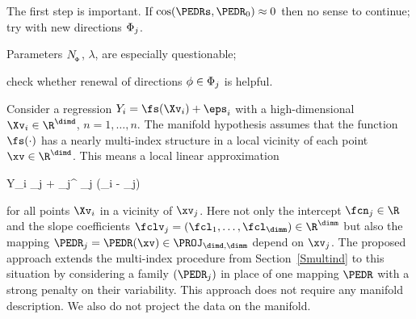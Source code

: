 {\color{blue} 
\begin{mylist}
\item
The first step is important. 
If \( \cos(\PEDRs,\PEDR_{0}) \approx 0 \) then no sense to continue;
try with new directions \( \Phi_{j} \).

\item
Parameters \( N_{_{\! \Phi}} \), \( \lambda \), are especially questionable;

\item
check whether renewal of directions \( \phi \in \Phi_{j} \) is helpful.


\end{mylist}

}


Consider a regression \( Y_{i} = \fs(\Xv_{i}) + \eps_{i} \) with a high-dimensional \( \Xv_{i} \in \R^{\dimd} \),
\( n = 1,\ldots,n \).
The manifold hypothesis assumes that the function \( \fs(\cdot) \) has a nearly multi-index structure in a local vicinity 
of each point \( \xv \in \R^{\dimd} \).
This means a local linear approximation
\begin{EQA}[c]
	\E Y_{i}
	\approx
	\fcn_{j} + \fclv_{j}^{\T} \PEDR_{j} (\Xv_{i} - \xv_{j})
\end{EQA}
for all points \( \Xv_{i} \) in a vicinity of \( \xv_{j} \).
Here not only the intercept \( \fcn_{j} \in \R \) and 
the slope coefficients \( \fclv_{j} = (\fcl_{1},\ldots,\fcl_{\dimm}) \in \R^{\dimm} \)
but also the mapping \( \PEDR_{j} = \PEDR(\xv) \in \PROJ_{\dimd,\dimm} \)
depend on \( \xv_{j} \).
%
The proposed approach extends the multi-index procedure from Section~\ref{Smultind} to this situation 
by considering a family \( (\PEDR_{j}) \) in place of one mapping \( \PEDR \) with a strong penalty on their variability.
This approach does not require any manifold description.
We also do not project the data on the manifold.

